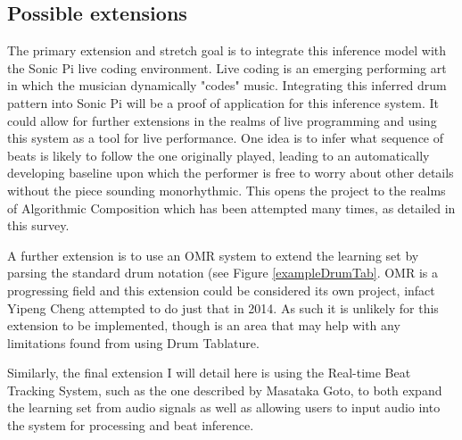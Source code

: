 \documentclass[12pt,a4]{article}
\begin{document}
        \subsection{Possible extensions}
The primary extension and stretch goal is to integrate this inference model with the Sonic Pi live coding environment. Live coding is an emerging performing art in which the musician dynamically "codes" music. Integrating this inferred drum pattern into Sonic Pi will be a proof of application for this inference system. It could allow for further extensions in the realms of live programming and using this system as a tool for live performance. One idea is to infer what sequence of beats is likely to follow the one originally played, leading to an automatically developing baseline upon which the performer is free to worry about other details without the piece sounding monorhythmic. This opens the project to the realms of Algorithmic Composition which has been attempted many times, as detailed in this survey\cite{algorithmicCompositionSurvey}.

A further extension is to use an OMR\footnotemark {} system to extend the learning set by parsing the standard drum notation (see Figure \ref{exampleDrumTab}. OMR is a progressing field and this extension could be considered its own project, infact Yipeng Cheng\cite{yipeng} attempted to do just that in 2014. As such it is unlikely for this extension to be implemented, though is an area that may help with any limitations found from using Drum Tablature.

Similarly, the final extension I will detail here is using the Real-time Beat Tracking System, such as the one described by Masataka Goto\cite{Goto01}, to both expand the learning set from audio signals as well as allowing users to input audio into the system for processing and beat inference.
 
\end{document}

